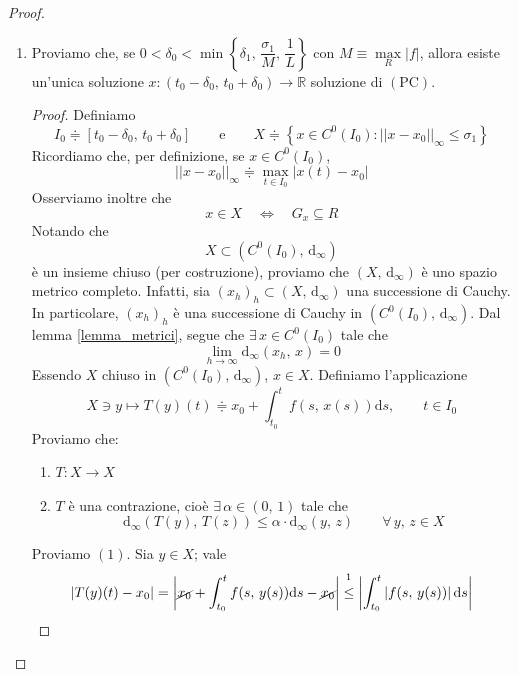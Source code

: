 \begin{proof}
\begin{enumerate}[labelindent=\parindent,leftmargin=*,label=\textnormal{\underline{Passo \arabic*}.},start=1]
	
	\item Proviamo che, se $0 < \delta_0 < \min\left\lbrace\delta_1,\,\dfrac{\sigma_1}{M},\,\dfrac{1}{L}\right\rbrace$ con $M \equiv \underset{R}{\max}|f|$, allora esiste un'unica soluzione $x: (t_0-\delta_0,\,t_0+\delta_0) \longrightarrow \mathbb{R}$ soluzione di $\mathrm{(PC)}$.
	\begin{proof}
	Definiamo
	$$
	I_0 \doteqdot [t_0-\delta_0,\,t_0+\delta_0]
	\qquad \text{e} \qquad
	X \doteqdot \left\lbrace x \in C^0(I_0) : ||x-x_0||_{\infty} \leq \sigma_1 \right\rbrace
	$$
	Ricordiamo che, per definizione, se $x \in C^0(I_0)$,
	$$
	||x-x_0||_{\infty} \doteqdot \underset{t \in I_0}{\max} |x(t) - x_0|
	$$
	Osserviamo inoltre che
	$$
	x \in X \quad \Longleftrightarrow \quad G_x \subseteq R
	$$
	Notando che
	$$
	X \subset \left( C^0(I_0),\,\mathrm{d}_{\infty} \right)
	$$
	è un insieme chiuso (per costruzione), proviamo che $\left( X,\,\mathrm{d}_{\infty} \right)$ è uno spazio metrico completo.
	Infatti, sia $(x_h)_h \subset (X,\,\mathrm{d}_{\infty})$ una successione di Cauchy. In particolare, $(x_h)_h$ è una successione di Cauchy in $\left( C^0(I_0),\,\mathrm{d}_{\infty} \right)$. Dal lemma \ref{lemma_metrici}, segue che $\exists \, x \in C^0(I_0)$ tale che
	$$
	\lim_{h \rightarrow \infty} \mathrm{d}_{\infty}(x_h,\,x) = 0
	$$
	Essendo $X$ chiuso in $\left( C^0(I_0),\,\mathrm{d}_{\infty} \right)$, $x \in X$. Definiamo l'applicazione
	$$
	X \ni y \longmapsto T(y)(t) \doteqdot x_0 + \int_{t_0}^t f(s,\,x(s))\mathrm{d}s, \qquad t \in I_0
	$$
	Proviamo che:
	\begin{enumerate}[labelindent=\parindent,leftmargin=*,label=\textnormal{(\arabic*)},start=1]
		\item $T: X \longrightarrow X$
		\item $T$ è una contrazione, cioè $\exists \, \alpha \in (0,\,1)$ tale che
		$$
		\mathrm{d}_{\infty} \left( T(y),\,T(z) \right) \leq \alpha \cdot \mathrm{d}_{\infty} (y,\,z) \qquad \forall \, y,\,z \in X
		$$
	\end{enumerate}
	Proviamo $\mathrm{(1)}$. Sia $y \in X$; vale
	$$
	\left| T(y)(t) - x_0 \right| = \left| \cancel{x_0} + \int_{t_0}^t f(s,\,y(s))\mathrm{d}s - \cancel{x_0} \right| \overset{\footnotemark}{\leq}
	\left| \int_{t_0}^t \left| f(s,\,y(s)) \right| \mathrm{d}s \right|
	$$
\end{proof}
\end{enumerate}
\end{proof}
